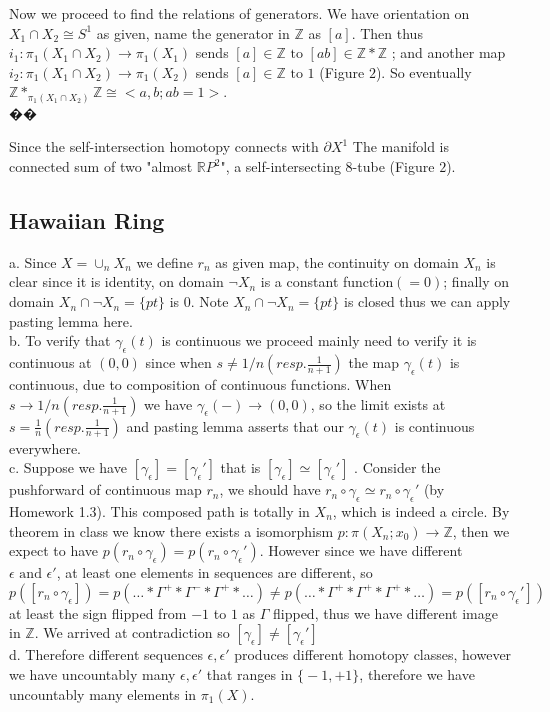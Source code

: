 \documentclass[11pt]{article}
\def\Z{{\mathbb Z}}
\def\R{{\mathbb R}}
\theoremstyle{remark}
\begin{document}
  Now we proceed to find the relations of generators. We have orientation on $X_1\cap X_2\cong S^1$ as given, name the generator in $\Z$ as $[a]$. Then thus $i_1:\pi_1(X_1\cap X_2) \rightarrow \pi_1(X_1) $ sends $[a]\in \Z \textrm{ to } [ab] \in \Z*\Z$ ; and another map $i_2:\pi_1(X_1\cap X_2) \rightarrow \pi_1(X_2) $ sends $[a]\in \Z \textrm{ to } 1$ (Figure $2$).  So eventually $\Z*_{\pi_1(X_1\cap X_2)}\Z \cong <a,b; ab=1>$. \\�� 
  
  Since the self-intersection homotopy connects with $\partial X^1$
  The manifold is connected sum of two "almost $\R P^2$", a self-intersecting $8$-tube (Figure $2$).
  
\subsection*{Hawaiian Ring} 
    a. Since $X=\cup_n X_n$ we define $r_n$ as given map, the continuity on domain $X_n$ is clear since it is identity, on domain $\neg X_n$ is a constant function$(=0)$; finally on domain $X_n \cap \neg X_n=\{pt\}$ is $0$. Note $X_n \cap \neg X_n=\{pt\}$ is closed thus we can apply pasting lemma here.  \\
    b. To verify that $\gamma_\epsilon(t)$ is continuous we proceed mainly need to verify it is continuous at $(0,0)$ since when $s\neq 1/n (resp. \frac{1}{n+1})$ the map $\gamma_\epsilon(t)$ is continuous, due to composition of continuous functions.  When $s\rightarrow 1/n (resp. \frac{1}{n+1})$ we have $\gamma_\epsilon(-)\rightarrow (0,0)$, so the limit exists at $s=\frac{1}{n} (resp. \frac{1}{n+1})$ and pasting lemma asserts that our $\gamma_\epsilon(t)$ is continuous everywhere. \\
    c. Suppose we have $[\gamma_\epsilon] = [\gamma_\epsilon']$ that is $[\gamma_\epsilon] \simeq [\gamma_\epsilon']$ . Consider the pushforward  of continuous map $r_n$, we should have $r_n\circ \gamma_\epsilon \simeq r_n\circ \gamma_\epsilon' $ (by Homework 1.3). This composed path is totally in $X_n$, which is indeed a circle. By theorem in class we know there exists a isomorphism  $p:\pi(X_n;x_0) \rightarrow \Z$, then we expect to have $p(r_n\circ \gamma_\epsilon) = p(r_n\circ \gamma_\epsilon')$. However since we have different $\epsilon \textrm{ and } \epsilon'$, at least one elements in sequences are different, so $p([r_n\circ \gamma_\epsilon])=p(\dots * \Gamma^+ * \Gamma^- * \Gamma^+ *\dots) \neq p(\dots * \Gamma^+ * \Gamma^+ * \Gamma^+ *\dots) = p([r_n\circ \gamma_\epsilon'])$ at least the sign flipped from $-1$ to $1$ as $\Gamma$ flipped, thus we have different image in $\Z$. We arrived at contradiction so  $[\gamma_\epsilon] \neq [\gamma_\epsilon']$ \\ 
    d. Therefore different sequences $\epsilon, \epsilon'$ produces different homotopy classes, however we have uncountably many $\epsilon, \epsilon'$ that ranges in $\textrm{\{}-1,+1 \textrm{\}} $, therefore we have uncountably many elements in  $\pi_1(X)$. 
\end{document}
